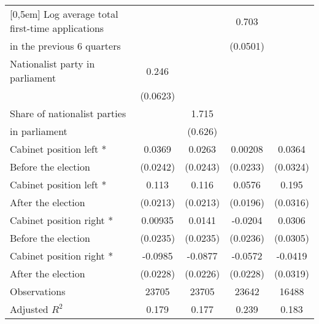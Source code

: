\begin{table}[htbp]
\begin{tabular}{l*{4}{c}}
[0,5em]
Log average total first-time applications &                     &                     &   0.703\sym{***}                   &                     \\
 in the previous 6 quarters                    &                     &                     &     (0.0501)                 &                     \\
[0,5em]
Nationalist party in parliament&       0.246\sym{***}&                     &                     &                     \\
                    &    (0.0623)         &                     &                     &                     \\
[0,5em]
Share of nationalist parties &                     &       1.715\sym{**} &                     &                     \\
in parliament                    &                     &     (0.626)         &                     &                     \\
[0,5em]
Cabinet position left *&      0.0369         &      0.0263         &     0.00208         &      0.0364         \\
 Before the election                    &    (0.0242)         &    (0.0243)         &    (0.0233)         &    (0.0324)         \\
[0,5em]
Cabinet position left * &       0.113\sym{***}&       0.116\sym{***}&      0.0576\sym{**} &       0.195\sym{***}\\
After the election                    &    (0.0213)         &    (0.0213)         &    (0.0196)         &    (0.0316)         \\
[0,5em]
Cabinet position right * &     0.00935         &      0.0141         &     -0.0204         &      0.0306         \\
Before the election                    &    (0.0235)         &    (0.0235)         &    (0.0236)         &    (0.0305)         \\
[0,5em]
Cabinet position right *&     -0.0985\sym{***}&     -0.0877\sym{***}&     -0.0572\sym{*}  &     -0.0419         \\
 After the election                    &    (0.0228)         &    (0.0226)         &    (0.0228)         &    (0.0319)         \\
\hline
Observations        &       23705         &       23705         &       23642         &       16488         \\
Adjusted \(R^{2}\)  &       0.179         &       0.177         &       0.239         &       0.183         \\

\end{tabular}
\end{table}
